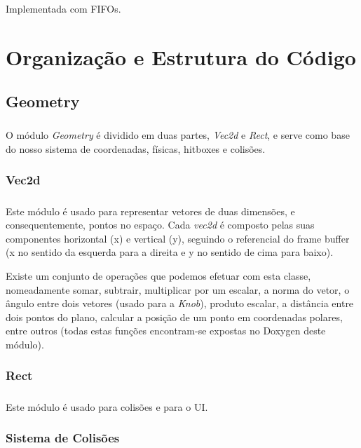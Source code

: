 \documentclass{report}
\begin{document}
Implementada com FIFOs.

\chapter{Organização e Estrutura do Código}

\section{Geometry}

\paragraph{}
O módulo \textit{Geometry} é dividido em duas partes, \textit{Vec2d} e \textit{Rect}, e serve como base do nosso sistema de coordenadas, físicas, hitboxes e colisões.

\subsection{Vec2d}

\paragraph{}
Este módulo é usado para representar vetores de duas dimensões, e consequentemente, pontos no espaço. Cada \textit{vec2d} é composto pelas suas componentes horizontal (x) e vertical (y), seguindo o referencial do frame buffer (x no sentido da esquerda para a direita e y no sentido de cima para baixo).

Existe um conjunto de operações que podemos efetuar com esta classe, nomeadamente somar, subtrair, multiplicar por um escalar, a norma do vetor, o ângulo entre dois vetores (usado para a \textit{Knob}), produto escalar, a distância entre dois pontos do plano, calcular a posição de um ponto em coordenadas polares, entre outros (todas estas funções encontram-se expostas no Doxygen deste módulo).

\subsection{Rect}

\paragraph{}
Este módulo é usado para colisões e para o UI. 

\subsection{Sistema de Colisões}
\end{document}
